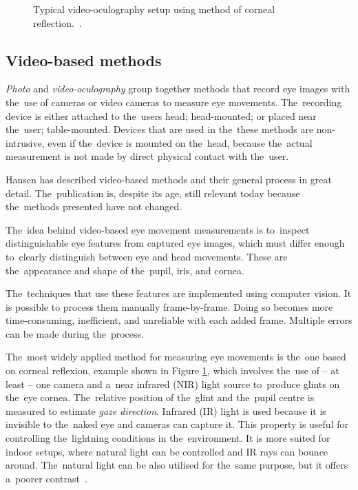 \begin{figure}[!ht]\centering
    
    \caption[Typical video-oculography setup using  method of corneal reflection.]{Typical video-oculography setup using method of corneal reflection.~\cite[p.~16497]{anuradha2017review}.}
    \label{fig:basic-vod}
\end{figure}

\subsection{Video-based methods}
\emph{Photo} and \emph{video-oculography} group together methods that record eye images with the~use of cameras or video cameras to measure eye movements. The~recording device is either attached to the~users head; head-mounted; or placed near the~user; table-mounted. Devices that are used in the~these methods are non-intrusive, even if the~device is mounted on the~head, because the~actual measurement is not made by direct physical contact with the~user.

Hansen has described video-based methods and their general process in great detail. The~publication is, despite its age, still relevant today because the~methods presented have not changed.~\cite{hansen2010}

The~idea behind video-based eye movement measurements is to~inspect distinguishable eye features from captured eye images, which must differ enough to~clearly distinguish between eye and head movements. These are the~appearance and shape of the~pupil, iris, and cornea.

The~techniques that use these features are implemented using computer vision. It is possible to process them manually frame-by-frame. Doing so becomes more time-consuming, inefficient, and unreliable with each added frame. Multiple errors can be made during the~process.

The~most widely applied method for measuring eye movements is the~one based on corneal reflexion, example shown in Figure \ref{fig:basic-vod}, which involves the~use of -- at least -- one camera and a~near infrared (NIR) light source to~produce glints on the~eye cornea. The~relative position of the~glint and the~pupil centre is measured to estimate \emph{gaze direction}. Infrared (IR) light is used because it is invisible to the~naked eye and cameras can capture it. This property is useful for controlling the~lightning conditions in the~environment. It is more suited for indoor setups, where natural light can be controlled and IR rays can bounce around.
The~natural light can be also utilised for the~same purpose, but it offers a~poorer contrast~\cite{hansen2010}.

